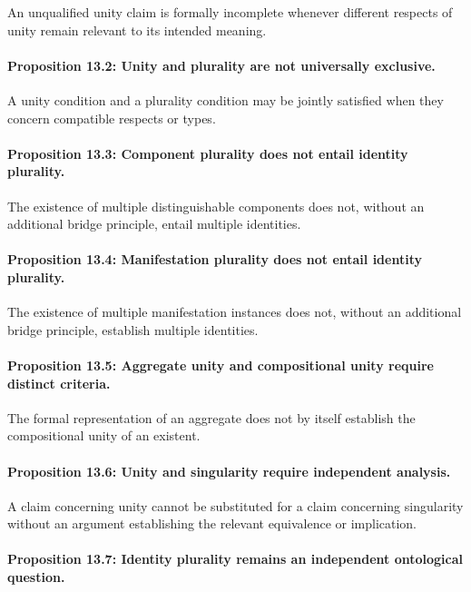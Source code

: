 An unqualified unity claim is
formally incomplete whenever
different respects of unity
remain relevant to its intended
meaning.

\paragraph{Proposition 13.2: Unity and plurality are not universally exclusive.}

A unity condition and a plurality
condition may be jointly satisfied
when they concern compatible
respects or types.

\paragraph{Proposition 13.3: Component plurality does not entail identity plurality.}

The existence of multiple
distinguishable components does
not, without an additional
bridge principle, entail multiple
identities.

\paragraph{Proposition 13.4: Manifestation plurality does not entail identity plurality.}

The existence of multiple
manifestation instances does
not, without an additional
bridge principle, establish
multiple identities.

\paragraph{Proposition 13.5: Aggregate unity and compositional unity require distinct criteria.}

The formal representation of
an aggregate does not by itself
establish the compositional
unity of an existent.

\paragraph{Proposition 13.6: Unity and singularity require independent analysis.}

A claim concerning unity cannot
be substituted for a claim
concerning singularity without
an argument establishing the
relevant equivalence or implication.

\paragraph{Proposition 13.7: Identity plurality remains an independent ontological question.}

